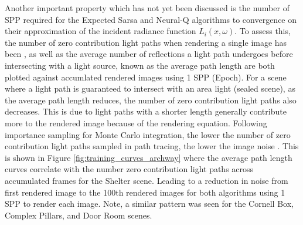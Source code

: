 \documentclass[../dissertation.tex]{subfiles}
\begin{document}
Another important property which has not yet been discussed is the number of SPP required for the Expected Sarsa and Neural-Q algorithms to convergence on their approximation of the incident radiance function $L_i(x, \omega)$. To assess this, the number of zero contribution light paths when rendering a single image has been , as well as the average number of reflections a light path undergoes before intersecting with a light source, known as the average path length are both plotted against accumlated rendered images using 1 SPP (Epoch). For a scene where a light path is guaranteed to intersect with an area light (sealed scene), as the average path length reduces, the number of zero contribution light paths also decreases. This is due to light paths with a shorter length generally contribute more to the rendered image because of the rendering equation. Following importance sampling for Monte Carlo integration, the lower the number of zero contribution light paths sampled in path tracing, the lower the image noise \cite{dahm2017learning}.  This is shown in Figure \ref{fig:training_curves_archway} where the average path length curves correlate with the number zero contribution light paths across accumulated frames for the Shelter scene. Leading to a reduction in noise from first rendered image to the 100th rendered images for both algorithms using 1 SPP to render each image. Note, a similar pattern was seen for the Cornell Box, Complex Pillars, and Door Room scenes.
\end{document}

